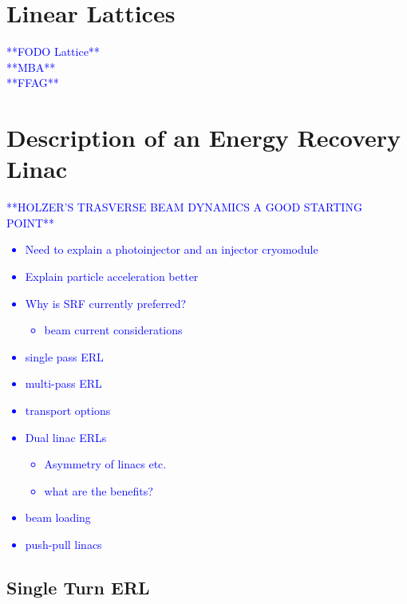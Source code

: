 \documentclass[../main.tex]{subfiles}
\begin{document}
\section{Linear Lattices}
\textcolor{blue}{**FODO Lattice** \\ **MBA** \\ **FFAG**}

\section{Description of an Energy Recovery Linac}

\textcolor{blue}{**HOLZER'S TRASVERSE BEAM DYNAMICS A GOOD STARTING POINT**}

\textcolor{blue}{\begin{itemize}
    \item{Need to explain a photoinjector and an injector cryomodule}
    \item{Explain particle acceleration better}
    \item{Why is SRF currently preferred?
        \begin{itemize}
            \item{beam current considerations} 
        \end{itemize}}
    \item{single pass ERL}
    \item{multi-pass ERL}
    \item{transport options}
    \item{Dual linac ERLs
        \begin{itemize}
            \item{Asymmetry of linacs etc.}
            \item{what are the benefits?}
        \end{itemize}}
    \item{beam loading}
    \item{push-pull linacs}
\end{itemize}}

\subsection{Single Turn ERL}
\end{document}
